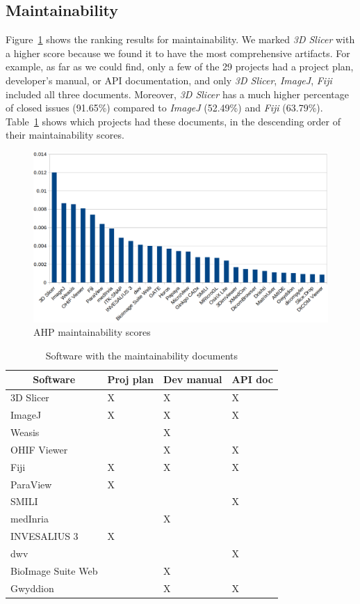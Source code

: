 \documentclass[final, 3p, times, authoryear]{elsarticle}
\begin{document}
\subsection{Maintainability} \label{sec_score_maintainability}

Figure~\ref{fg_maintainability_scores} shows the ranking results for
maintainability. We marked \textit{3D Slicer} with a higher score because
we found it to have the most comprehensive artifacts. For example, as far as we
could find, only a few of the 29 projects had a project plan, developer's
manual, or API documentation, and only \textit{3D Slicer}, \textit{ImageJ},
\textit{Fiji} included all three documents. Moreover, \textit{3D Slicer} has a
much higher percentage of closed issues (91.65\%) compared to \textit{ImageJ}
(52.49\%) and \textit{Fiji} (63.79\%). Table~\ref{tab_maintainability_docs}
shows which projects had these documents, in the descending order of their
maintainability scores. 

\begin{figure}[ht]
\includegraphics[scale=0.38]{figures/maintainability_scores.png}
\caption{AHP maintainability scores}
\label{fg_maintainability_scores}
\end{figure}

\begin{table}[ht]
\centering
\begin{tabular}{llll}
\hline
\multicolumn{1}{c}{Software} & Proj plan & Dev manual & API doc \\ \hline
3D Slicer & X & X & X \\
ImageJ & X & X & X \\
Weasis &  & X &  \\
OHIF Viewer &  & X & X \\
Fiji & X & X & X \\
ParaView & X &  &  \\
SMILI &  &  & X \\
medInria &  & X &  \\
INVESALIUS 3 & X &  &  \\
dwv &  &  & X \\
BioImage Suite Web &  & X &  \\
Gwyddion &  & X & X \\ \hline
\end{tabular}
\caption{\label{tab_maintainability_docs}Software with the maintainability documents}
\end{table}
\end{document}
